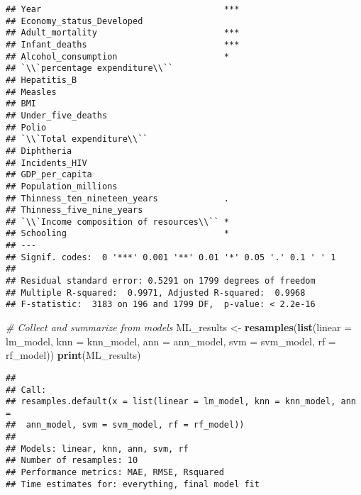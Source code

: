 \documentclass[
]{article}
\newenvironment{Shaded}{\begin{snugshade}}{\end{snugshade}}
\newcommand{\AttributeTok}[1]{\textcolor[rgb]{0.13,0.29,0.53}{#1}}
\newcommand{\CommentTok}[1]{\textcolor[rgb]{0.56,0.35,0.01}{\textit{#1}}}
\newcommand{\FunctionTok}[1]{\textcolor[rgb]{0.13,0.29,0.53}{\textbf{#1}}}
\newcommand{\NormalTok}[1]{#1}
\newcommand{\OtherTok}[1]{\textcolor[rgb]{0.56,0.35,0.01}{#1}}
\begin{document}
\begin{verbatim}
## Year                                    ***
## Economy_status_Developed                   
## Adult_mortality                         ***
## Infant_deaths                           ***
## Alcohol_consumption                     *  
## `\\`percentage expenditure\\``             
## Hepatitis_B                                
## Measles                                    
## BMI                                        
## Under_five_deaths                          
## Polio                                      
## `\\`Total expenditure\\``                  
## Diphtheria                                 
## Incidents_HIV                              
## GDP_per_capita                             
## Population_millions                        
## Thinness_ten_nineteen_years             .  
## Thinness_five_nine_years                   
## `\\`Income composition of resources\\`` *  
## Schooling                               *  
## ---
## Signif. codes:  0 '***' 0.001 '**' 0.01 '*' 0.05 '.' 0.1 ' ' 1
## 
## Residual standard error: 0.5291 on 1799 degrees of freedom
## Multiple R-squared:  0.9971, Adjusted R-squared:  0.9968 
## F-statistic:  3183 on 196 and 1799 DF,  p-value: < 2.2e-16
\end{verbatim}

\begin{Shaded}
\begin{Highlighting}[]
\CommentTok{\# Collect and summarize from models}
\NormalTok{ML\_results }\OtherTok{\textless{}{-}} \FunctionTok{resamples}\NormalTok{(}\FunctionTok{list}\NormalTok{(}\AttributeTok{linear =}\NormalTok{ lm\_model, }\AttributeTok{knn =}\NormalTok{ knn\_model, }\AttributeTok{ann =}\NormalTok{ ann\_model, }\AttributeTok{svm =}\NormalTok{ svm\_model, }\AttributeTok{rf =}\NormalTok{ rf\_model))}
\FunctionTok{print}\NormalTok{(ML\_results)}
\end{Highlighting}
\end{Shaded}

\begin{verbatim}
## 
## Call:
## resamples.default(x = list(linear = lm_model, knn = knn_model, ann =
##  ann_model, svm = svm_model, rf = rf_model))
## 
## Models: linear, knn, ann, svm, rf 
## Number of resamples: 10 
## Performance metrics: MAE, RMSE, Rsquared 
## Time estimates for: everything, final model fit
\end{verbatim}
\end{document}
